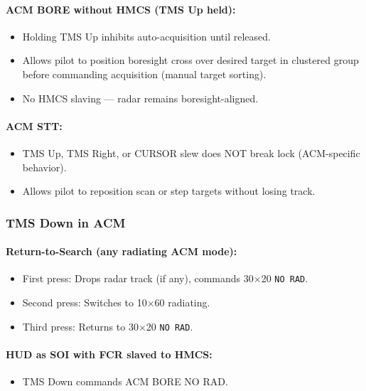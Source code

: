 \documentclass[11pt, a4paper, twoside]{report}
\begin{document}
\paragraph{ACM BORE without HMCS (TMS Up held):}
\begin{itemize}[nosep]
    \item Holding TMS Up inhibits auto-acquisition until released.
    \item Allows pilot to position boresight cross over desired target in clustered 
          group before commanding acquisition (manual target sorting).
    \item No HMCS slaving --- radar remains boresight-aligned.
\end{itemize}

\paragraph{ACM STT:}
\begin{itemize}[nosep]
    \item TMS Up, TMS Right, or CURSOR slew does NOT break lock (ACM-specific behavior).
    \item Allows pilot to reposition scan or step targets without losing track.
\end{itemize}

\subsubsection*{TMS Down in ACM}
\label{sec:C4-S3-S4-S2}

\paragraph{Return-to-Search (any radiating ACM mode):}
\begin{itemize}[nosep]
    \item First press: Drops radar track (if any), commands 30$\times$20 \texttt{NO RAD}.
    \item Second press: Switches to 10$\times$60 radiating.
    \item Third press: Returns to 30$\times$20 \texttt{NO RAD}.
\end{itemize}

\paragraph{HUD as SOI with FCR slaved to HMCS:}
\begin{itemize}[nosep]
    \item TMS Down commands ACM BORE NO RAD.
\end{itemize}
\end{document}

